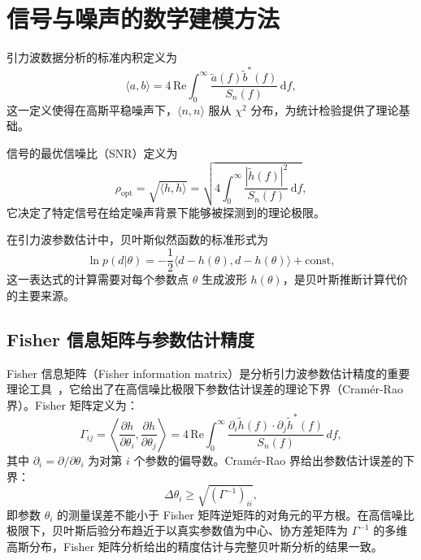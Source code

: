 \section{信号与噪声的数学建模方法}

引力波数据分析的标准内积定义为~\cite{Cutler1994PE}
\begin{equation}
  \langle a, b\rangle = 4\,\mathrm{Re}\int_0^\infty \frac{\tilde{a}(f)\tilde{b}^*(f)}{S_n(f)}\,\mathrm{d}f,
\end{equation}
这一定义使得在高斯平稳噪声下，$\langle n, n\rangle$ 服从 $\chi^2$ 分布，为统计检验提供了理论基础。

信号的最优信噪比（SNR）定义为
\begin{equation}
  \rho_\mathrm{opt} = \sqrt{\langle h, h\rangle} = \sqrt{4\int_0^\infty \frac{|\tilde{h}(f)|^2}{S_n(f)}\,\mathrm{d}f},
\end{equation}
它决定了特定信号在给定噪声背景下能够被探测到的理论极限。

在引力波参数估计中，贝叶斯似然函数的标准形式为~\cite{Veitch2015LALInference,Ashton2019Bilby}
\begin{equation}
  \ln p(d|\theta) = -\frac{1}{2}\langle d - h(\theta), d - h(\theta)\rangle + \text{const},
\end{equation}
这一表达式的计算需要对每个参数点 $\theta$ 生成波形 $h(\theta)$，是贝叶斯推断计算代价的主要来源。

\subsection{Fisher 信息矩阵与参数估计精度}

Fisher 信息矩阵（Fisher information matrix）是分析引力波参数估计精度的重要理论工具~\cite{Cutler1994PE}，它给出了在高信噪比极限下参数估计误差的理论下界（Cramér-Rao 界）。Fisher 矩阵定义为：
\begin{equation}
  \Gamma_{ij} = \left\langle \frac{\partial h}{\partial \theta_i}, \frac{\partial h}{\partial \theta_j} \right\rangle = 4\,\text{Re}\int_0^\infty \frac{\partial_i \tilde{h}(f) \cdot \partial_j \tilde{h}^*(f)}{S_n(f)}\,df,
\end{equation}
其中 $\partial_i = \partial/\partial\theta_i$ 为对第 $i$ 个参数的偏导数。Cramér-Rao 界给出参数估计误差的下界：
\begin{equation}
  \Delta\theta_i \geq \sqrt{(\Gamma^{-1})_{ii}},
\end{equation}
即参数 $\theta_i$ 的测量误差不能小于 Fisher 矩阵逆矩阵的对角元的平方根。在高信噪比极限下，贝叶斯后验分布趋近于以真实参数值为中心、协方差矩阵为 $\Gamma^{-1}$ 的多维高斯分布，Fisher 矩阵分析给出的精度估计与完整贝叶斯分析的结果一致。


